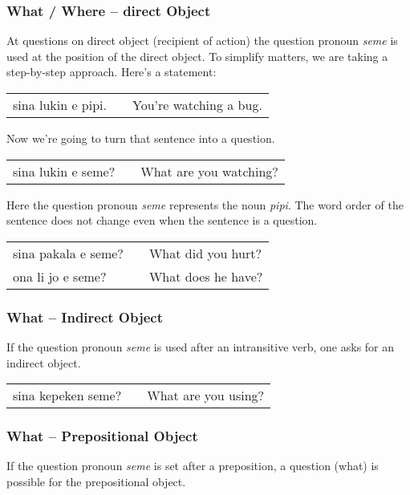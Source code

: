 \subsubsection*{What / Where -- direct Object}
At questions on direct object (recipient of action) the question pronoun \textit{seme} is used at the position of the direct object.
To simplify matters, we are taking a step-by-step approach.
Here's a statement:

\begin{supertabular}{p{5,5cm}|ll}
    sina lukin e pipi. &  & You're watching a bug. \\
\end{supertabular}

Now we're going to turn that sentence into a question.

\begin{supertabular}{p{5,5cm}|ll}
    sina lukin e seme? &  & What are you watching? \\
\end{supertabular}

Here the question pronoun \textit{seme} represents the noun \textit{pipi}.
The word order of the sentence does not change even when the sentence is a question.

\begin{supertabular}{p{5,5cm}|ll}
    sina pakala e seme? &  & What did you hurt? \\
    ona li jo e seme?   &  & What does he have? \\
\end{supertabular}
\subsubsection*{What -- Indirect Object}
If the question pronoun \textit{seme} is used after an intransitive verb, one asks for an indirect object.

\begin{supertabular}{p{5,5cm}|ll}
    sina kepeken seme? &  & What are you using? \\
\end{supertabular}

\subsubsection*{What -- Prepositional Object}
If the question pronoun \textit{seme} is set after a preposition, a question (what) is possible for the prepositional object. \\

